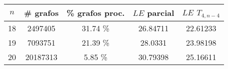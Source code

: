 \begin{tabular}{|c|c|c|c|c|}
    \hline
    $n$ & \# grafos & \% grafos proc. & $LE$ parcial & $LE$ $T_{4,n-4}$ \\
    \hline
    18 & 2497405 & 31.74 \% & 26.84711 & 22.61233 \\
    \hline
    19 & 7093751 & 21.39 \% & 28.0331 & 23.98198 \\
    \hline
    20 & 20187313 & 5.85 \% & 30.79398 & 25.16611 \\
    \hline
\end{tabular}